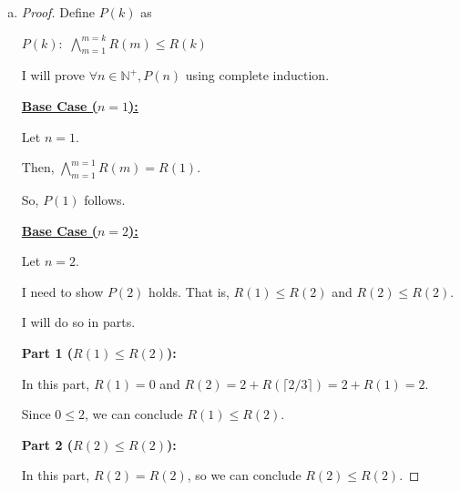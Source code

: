 \documentclass[12pt]{article}
\begin{document}
\begin{enumerate}[a.]
    \item

    \bigskip

    \begin{proof}
        Define $P(k)$ as

        \begin{center}
            $P(k):$ $\bigwedge\limits_{m=1}^{m=k} R(m) \leq R(k)$
        \end{center}

        \bigskip

        I will prove $\forall n \in \mathbb{N}^+, P(n)$ using complete induction.

        \bigskip

        \underline{\textbf{Base Case ($n = 1$):}}

        \bigskip

        Let $n = 1$.

        \bigskip

        Then, $\bigwedge\limits_{m=1}^{m=1} R(m) = R(1)$.

        \bigskip

        So, $P(1)$ follows.

        \bigskip

        \underline{\textbf{Base Case ($n = 2$):}}

        \bigskip

        Let $n = 2$.

        \bigskip

        I need to show $P(2)$ holds. That is, $R(1) \leq R(2)$ and $R(2) \leq R(2)$.

        \bigskip

        I will do so in parts.

        \bigskip

        \textbf{Part 1 ($R(1) \leq R(2)$):}

        \bigskip

        In this part, $R(1) = 0$ and $R(2) = 2 + R(\lceil 2/3 \rceil) = 2 + R(1) = 2$.

        \bigskip

        Since $0 \leq 2$, we can conclude $R(1) \leq R(2)$.

        \bigskip

        \textbf{Part 2 ($R(2) \leq R(2)$):}

        \bigskip

        In this part, $R(2) = R(2)$, so we can conclude $R(2) \leq R(2)$.


\end{proof}
\end{enumerate}
\end{document}
